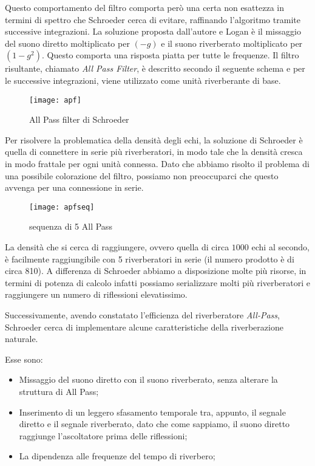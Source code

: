 Questo comportamento del filtro comporta però una certa non esattezza in
termini di spettro che Schroeder cerca di evitare, raffinando l’algoritmo
tramite successive integrazioni.
La soluzione proposta dall’autore e Logan è il missaggio del suono diretto
moltiplicato per $(-g)$ e il suono riverberato moltiplicato per $(1-g^2)$.
Questo comporta una risposta piatta per tutte le frequenze. Il filtro
risultante, chiamato \emph{All Pass Filter}, è descritto secondo il seguente
schema e per le successive integrazioni, viene utilizzato come unità
riverberante di base.

\begin{figure}[htp]
\centering
\texttt{[image: apf]}
\caption{All Pass filter di Schroeder}
\label{fig:apf}
\end{figure}

Per risolvere la problematica della densità degli echi, la soluzione di
Schroeder è quella di connettere in serie più riverberatori, in modo tale che
la densità cresca in modo frattale per ogni unità connessa. Dato che abbiamo
risolto il problema di una possibile colorazione del filtro, possiamo non
preoccuparci che questo avvenga per una connessione in serie.

\begin{figure}[htp]
\centering
\texttt{[image: apfseq]}
\caption{sequenza di 5 All Pass}
\label{fig:apfseq}
\end{figure}

La densità che si cerca di raggiungere, ovvero quella di circa $1000$ echi al
secondo, è facilmente raggiungibile con 5 riverberatori in serie (il numero
prodotto è di circa 810). A differenza di Schroeder abbiamo a disposizione
molte più risorse, in termini di potenza di calcolo infatti possiamo
serializzare molti più riverberatori e raggiungere un numero di riflessioni
elevatissimo.

Successivamente, avendo constatato l’efficienza del riverberatore \emph{All-Pass},
Schroeder cerca di implementare alcune caratteristiche della riverberazione
naturale.

Esse sono:

\begin{itemize}
\item Missaggio del suono diretto con il suono riverberato, senza alterare la
      struttura di All Pass;
\item Inserimento di un leggero sfasamento temporale tra, appunto, il segnale
      diretto e il segnale riverberato, dato che come sappiamo, il suono diretto
      raggiunge l’ascoltatore prima delle riflessioni;
\item La dipendenza alle frequenze del tempo di riverbero;
\end{itemize}

